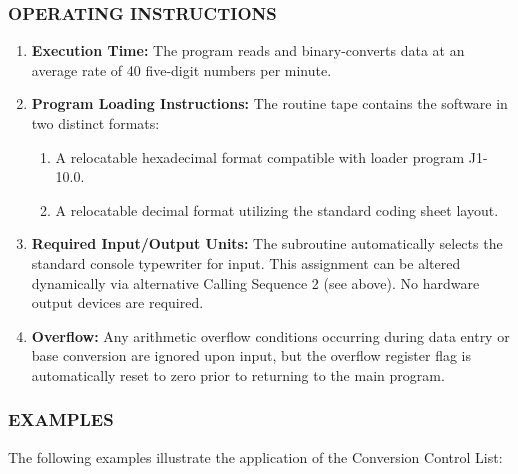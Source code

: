 \subsubsection*{OPERATING INSTRUCTIONS}
\begin{enumerate}
    \item \textbf{Execution Time:} The program reads and binary-converts data at an average rate of 40 five-digit numbers per minute.
    \item \textbf{Program Loading Instructions:} The routine tape contains the software in two distinct formats:
    \begin{enumerate}[label=\alph*)]
        \item A relocatable hexadecimal format compatible with loader program J1-10.0.
        \item A relocatable decimal format utilizing the standard coding sheet layout.
    \end{enumerate}
    \item \textbf{Required Input/Output Units:} The subroutine automatically selects the standard console typewriter for input. This assignment can be altered dynamically via alternative Calling Sequence 2 (see above). No hardware output devices are required.
    \item \textbf{Overflow:} Any arithmetic overflow conditions occurring during data entry or base conversion are ignored upon input, but the overflow register flag is automatically reset to zero prior to returning to the main program.
\end{enumerate}

\subsubsection*{EXAMPLES}
The following examples illustrate the application of the Conversion Control List:

